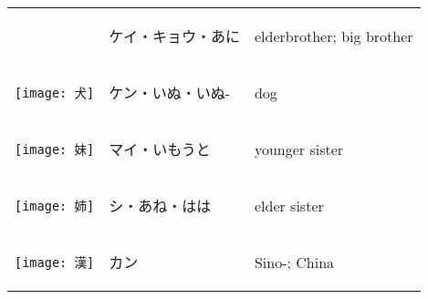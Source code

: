 \documentclass[a4paper,12pt]{extarticle}
\begin{document}
\begin{longtable}{|lp{6cm}p{4cm}|}
\begin{minipage}{0.3\textwidth}
{}
\end{minipage}
&
\begin{CJK}{UTF8}{min}ケイ・キョウ・あに\end{CJK}
&
elderbrother; big brother
\\ 
\begin{minipage}{0.3\textwidth}
\centerline{
	\texttt{[image: 犬]}
}
\end{minipage}
&
\begin{CJK}{UTF8}{min}ケン・いぬ・いぬ-\end{CJK}
&
dog
\\ 
\begin{minipage}{0.3\textwidth}
\centerline{
	\texttt{[image: 妹]}
}
\end{minipage}
&
\begin{CJK}{UTF8}{min}マイ・いもうと\end{CJK}
&
younger sister
\\ 
\begin{minipage}{0.3\textwidth}
\centerline{
	\texttt{[image: 姉]}
}
\end{minipage}
&
\begin{CJK}{UTF8}{min}シ・あね・はは\end{CJK}
&
elder sister
\\ 
\begin{minipage}{0.3\textwidth}
\centerline{
	\texttt{[image: 漢]}
}
\end{minipage}
&
\begin{CJK}{UTF8}{min}カン\end{CJK}
&
Sino-; China
\\ 
\end{longtable}
\end{document}
